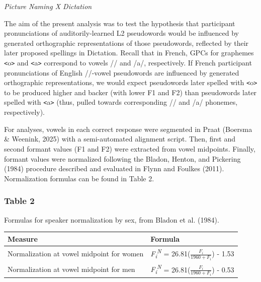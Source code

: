 \documentclass[
  english,
  man,floatsintext]{apa7}
\newcounter{none} %
\begin{document}
\emph{Picture Naming X Dictation}

The aim of the present analysis was to test the hypothesis that participant pronunciations of auditorily-learned L2 pseudowords would be influenced by generated orthographic representations of those pseudowords, reflected by their later proposed spellings in Dictation. Recall that in French, GPCs for graphemes \texttt{\textless{}}o\texttt{\textgreater{}} and \texttt{\textless{}}a\texttt{\textgreater{}} correspond to vowels /\textopeno/ and /a/, respectively. If French participant pronunciations of English /\textscripta/-vowel pseudowords are influenced by generated orthographic representations, we would expect pseudowords later spelled with \texttt{\textless{}}o\texttt{\textgreater{}} to be produced higher and backer (with lower F1 and F2) than pseudowords later spelled with \texttt{\textless{}}a\texttt{\textgreater{}} (thus, pulled towards corresponding /\textopeno/ and /a/ phonemes, respectively).

For analyses, vowels in each correct response were segmented in Praat (Boersma \& Weenink, 2025) with a semi-automated alignment script. Then, first and second formant values (F1 and F2) were extracted from vowel midpoints. Finally, formant values were normalized following the Bladon, Henton, and Pickering (1984) procedure described and evaluated in Flynn and Foulkes (2011). Normalization formulas can be found in Table 2.

\subsubsection{Table 2}\label{table-2}

Formulas for speaker normalization by sex, from Bladon et al. (1984).

{\def\LTcaptype{none} %
\begin{longtable}[]{@{}
  >{\raggedright\arraybackslash}p{}
  >{\raggedright\arraybackslash}p{}@{}}
\toprule\noalign{}
\begin{minipage}[b]{\linewidth}\raggedright
Measure
\end{minipage} & \begin{minipage}[b]{\linewidth}\raggedright
Formula
\end{minipage} \\
\midrule\noalign{}
\endhead
\bottomrule\noalign{}
\endlastfoot
Normalization at vowel midpoint for women & \emph{F\textsubscript{i}\textsuperscript{N}} = 26.81(\(\frac{F_i}{1960+F_i}\)) - 1.53 \\
Normalization at vowel midpoint for men & \emph{F\textsubscript{i}\textsuperscript{N}} = 26.81(\(\frac{F_i}{1960+F_i}\)) - 0.53 \\
\end{longtable}
}
\end{document}
